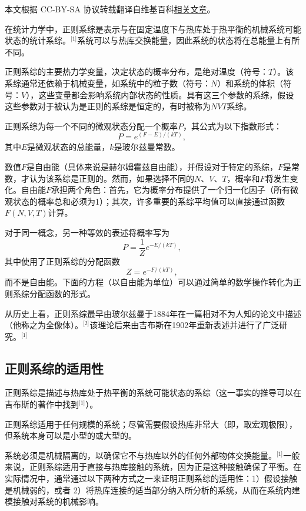 
本文根据 CC-BY-SA 协议转载翻译自维基百科\href{https://en.wikipedia.org/wiki/Canonical_ensemble}{相关文章}。

在统计力学中，正则系综是表示与在固定温度下与热库处于热平衡的机械系统可能状态的统计系综。\(^\text{[1]}\)系统可以与热库交换能量，因此系统的状态将在总能量上有所不同。

正则系综的主要热力学变量，决定状态的概率分布，是绝对温度（符号：\(T\)）。该系综通常还依赖于机械变量，如系统中的粒子数（符号：\(N\)）和系统的体积（符号：\(V\)），这些变量都会影响系统内部状态的性质。具有这三个参数的系综，假设这些参数对于被认为是正则的系综是恒定的，有时被称为\(NVT\)系综。

正则系综为每一个不同的微观状态分配一个概率\(P\)，其公式为以下指数形式：
\[
P = e^{(F - E) / (kT)},~
\]
其中\(E\)是微观状态的总能量，\(k\)是玻尔兹曼常数。

数值\(F\)是自由能（具体来说是赫尔姆霍兹自由能），并假设对于特定的系综，\(F \)是常数，才认为该系综是正则的。然而，如果选择不同的\(N\)、\(V\)、\( T\)，概率和\(F\)将发生变化。自由能\(F\)承担两个角色：首先，它为概率分布提供了一个归一化因子（所有微观状态的概率总和必须为1）；其次，许多重要的系综平均值可以直接通过函数\(F(N, V, T)\)计算。

对于同一概念，另一种等效的表述将概率写为
\[
P = \frac{1}{Z} e^{-E / (kT)},~
\]
其中使用了正则系综的分配函数
\[
Z = e^{-F / (kT)},~
\]
而不是自由能。下面的方程（以自由能为单位）可以通过简单的数学操作转化为正则系综分配函数的形式。

从历史上看，正则系综最早由玻尔兹曼于1884年在一篇相对不为人知的论文中描述（他称之为全像体）。\(^\text{[2]}\)该理论后来由吉布斯在1902年重新表述并进行了广泛研究。\(^\text{[1]}\)
\subsection{正则系综的适用性}  
正则系综是描述与热库处于热平衡的系统可能状态的系综（这一事实的推导可以在吉布斯的著作中找到\(^\text{[1]}\)）。

正则系综适用于任何规模的系统；尽管需要假设热库非常大（即，取宏观极限），但系统本身可以是小型的或大型的。

系统必须是机械隔离的，以确保它不与热库以外的任何外部物体交换能量。\(^\text{[1]}\)一般来说，正则系综适用于直接与热库接触的系统，因为正是这种接触确保了平衡。在实际情况中，通常通过以下两种方式之一来证明正则系综的适用性：1）假设接触是机械弱的，或者 2）将热库连接的适当部分纳入所分析的系统，从而在系统内建模接触对系统的机械影响。

